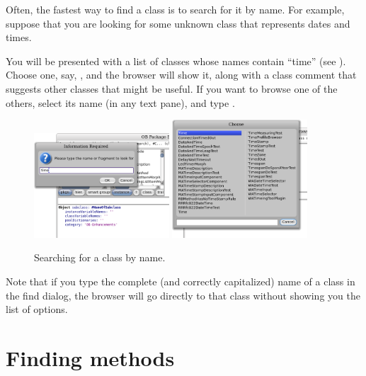 \documentclass[a4paper,10pt,twoside]{book}
\begin{document}
Often, the fastest way to find a class is to search for it by name.  For example, suppose that you are looking for some unknown class that represents dates and times.

\noindent
You will be presented with a list of classes whose names contain ``time'' (see ).  Choose one, say, , and the browser will show it, along with a class comment that suggests other classes that might be useful.  If you want to browse one of the others, select its name (in any text pane), and type .

\begin{figure}[hbt]
\centerline{
	\includegraphics[width=0.45\textwidth]{FindIt}
	\hspace{1cm}
	\includegraphics[width=0.45\textwidth]{TimeClasses}
}
\caption{Searching for a class by name.
\label{fig:findit}}
\end{figure}

Note that if you type the complete (and correctly capitalized) name of a class in the find dialog, the browser will go directly to that class without showing you the list of options.

\section{Finding methods}
\label{sec:quick:methodFinder}
\end{document}
